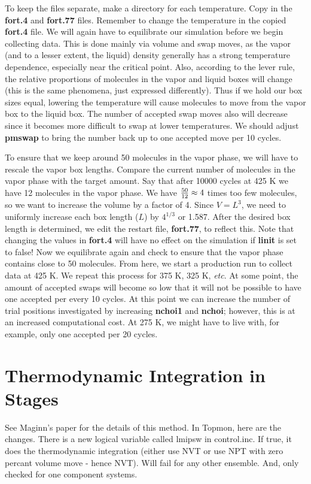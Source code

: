 \documentclass[12pt,letterpaper]{article}
\begin{document}
{{{{{{\noindent To keep the files separate, make a directory for each
temperature.  Copy in the {\bf fort.4} and {\bf fort.77} files. 
Remember to change the temperature in the copied {\bf fort.4} file.  We
will again have to equilibrate our simulation before we begin
collecting data.  This is done mainly via volume and swap moves, as the
vapor (and to a lesser extent, the liquid) density generally has a strong
temperature dependence, especially near the critical point.  Also, according to the 
lever rule, the relative proportions of molecules in the
vapor and liquid boxes will change (this is the same phenomena, just
expressed differently).  Thus if we hold our box sizes equal,
lowering the temperature will cause molecules to move from the vapor box to the liquid box.  
The number of accepted swap moves also will decrease since it becomes more difficult 
to swap at lower temperatures.  We should adjust {\bf pmswap} to bring the number back up to one
accepted move per 10 cycles.  

\noindent To ensure that we keep around 50 molecules in the vapor
phase, we will have to rescale the vapor box lengths.  
Compare the current number of molecules in the
vapor phase with the target amount.  Say that after 10000 cycles at
425 K we have 12 molecules in the vapor phase.  We have ${{50}
\over {12}} \approx 4$ times too few molecules, so we want to increase
the volume by a factor of 4.  Since $V=L^3$, we need to uniformly
increase each box length ($L$) by $4^{1/3}$ or 1.587.  After the desired box length
is determined, we edit the restart file, {\bf fort.77}, to reflect this.  
Note that changing the values in {\bf fort.4} will have no effect on the simulation
if {\bf linit} is set to false!  
Now we equilibrate again and check to ensure that the vapor phase contains close to 50 molecules.  
From here, we start a production run to collect data at 425 K.  We repeat this process for 375 K, 325 K, {\it etc}.  
At some point, the amount of accepted swaps will become so low
that it will not be possible to have one accepted per every 10 cycles.  
At this point we can increase the number of trial positions investigated by increasing {\bf
nchoi1} and {\bf nchoi}; however, this is at an increased computational cost.  At
275 K, we might have to live with, for example, only one accepted per 20 cycles.

\section{Thermodynamic Integration in Stages} 
See Maginn's paper for the details of this method.  In Topmon, here are the
changes. There is a new logical variable called lmipsw in control.inc.
If true, it does the thermodynamic integration (either use NVT or use
NPT with zero percant volume move - hence NVT). Will fail for
any other ensemble. And, only checked for one component systems.

}}}}}}
\end{document}
